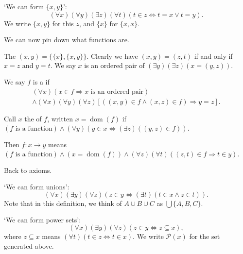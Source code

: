 \documentclass[a4paper, 10pt, twocolumn]{amsart}
\begin{document}
\begin{axiom}
  `We can form $\{x, y\}$':
  $$
(\forall x)(\forall y)(\exists z)(\forall t)(t \in z \Leftrightarrow t = x \lor t = y).
  $$
  We write $\{x, y\}$ for this $z$, and $\{x\}$ for $\{x, x\}$.
\end{axiom}

We can now pin down what functions are.

\begin{definition}
  The  $(x, y) = \{\{x\}, \{x, y\}\}$. Clearly we have $(x, y) = (z, t)$ if and only if $x = z$ and $y = t$.
  We say $x$ is an ordered pair of $(\exists y)(\exists z)(x = (y, z))$.
\end{definition}
\begin{definition}[Function]
  We say $f$ is a  if
  \begin{align*}
  (\forall x)(x \in f \Rightarrow x\text{ is an ordered pair})\\
  \land (\forall x)(\forall y)(\forall z) [((x, y) \in f\land (x, z) \in f) \Rightarrow y = z].
  \end{align*}
\end{definition}
\begin{definition}[Domain]
  Call $x$ the  of $f$, written $x = \operatorname{dom}(f)$ if $(f \text{ is a function})\land (\forall y)(y \in x \Leftrightarrow (\exists z)((y, z) \in f))$. 
  
  Then $f: x \rightarrow y$ means $(f\text{ is a function}) \land (x = \operatorname{dom}(f)) \land (\forall z)(\forall t)((z, t) \in f \Rightarrow t \in y)$.
\end{definition}


Back to axioms.

\begin{axiom}
  `We can form unions':
  $$
(\forall x)(\exists y)(\forall z)(z \in y \Leftrightarrow (\exists t)(t \in x \land z \in t)).
  $$
  Note that in this definition, we think of $A \cup B \cup C$ as $\bigcup \{A, B, C\}$.
\end{axiom}

\begin{axiom}
  `We can form power sets':
  $$
  (\forall x)(\exists y)(\forall z)(z \in y \Leftrightarrow z \subseteq x),
  $$
  where $z \subseteq x$ means $(\forall t)(t \in z \Leftrightarrow t \in x)$. We write $\mathcal{P}(x)$ for the set generated above.
\end{axiom}
\end{document}

